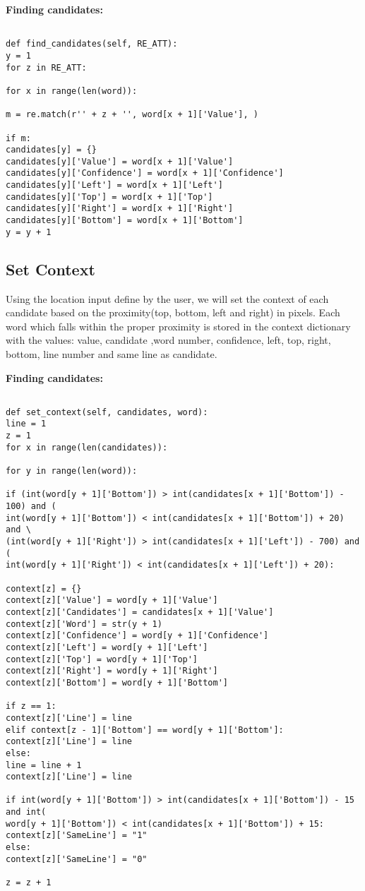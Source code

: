 \bigskip
\noindent
\textbf{Finding candidates:}
\begin{footnotesize}
\begin{verbatim}

def find_candidates(self, RE_ATT):
y = 1
for z in RE_ATT:

for x in range(len(word)):

m = re.match(r'' + z + '', word[x + 1]['Value'], )

if m:
candidates[y] = {}
candidates[y]['Value'] = word[x + 1]['Value']
candidates[y]['Confidence'] = word[x + 1]['Confidence']
candidates[y]['Left'] = word[x + 1]['Left']
candidates[y]['Top'] = word[x + 1]['Top']
candidates[y]['Right'] = word[x + 1]['Right']
candidates[y]['Bottom'] = word[x + 1]['Bottom']
y = y + 1
\end{verbatim}
\end{footnotesize}

\subsection{Set Context}

Using the location input define by the user, we will set the context of each
candidate based on the proximity(top, bottom, left and right) in pixels.
Each word which falls within the proper proximity is stored in the context
dictionary with the values: value, candidate ,word number, confidence,
left, top, right, bottom, line number and same line as candidate.

\bigskip
\noindent
\textbf{Finding candidates:}
\begin{footnotesize}
\begin{verbatim}

def set_context(self, candidates, word):
line = 1
z = 1
for x in range(len(candidates)):

for y in range(len(word)):

if (int(word[y + 1]['Bottom']) > int(candidates[x + 1]['Bottom']) - 100) and (
int(word[y + 1]['Bottom']) < int(candidates[x + 1]['Bottom']) + 20) and \
(int(word[y + 1]['Right']) > int(candidates[x + 1]['Left']) - 700) and (
int(word[y + 1]['Right']) < int(candidates[x + 1]['Left']) + 20):

context[z] = {}
context[z]['Value'] = word[y + 1]['Value']
context[z]['Candidates'] = candidates[x + 1]['Value']
context[z]['Word'] = str(y + 1)
context[z]['Confidence'] = word[y + 1]['Confidence']
context[z]['Left'] = word[y + 1]['Left']
context[z]['Top'] = word[y + 1]['Top']
context[z]['Right'] = word[y + 1]['Right']
context[z]['Bottom'] = word[y + 1]['Bottom']

if z == 1:
context[z]['Line'] = line
elif context[z - 1]['Bottom'] == word[y + 1]['Bottom']:
context[z]['Line'] = line
else:
line = line + 1
context[z]['Line'] = line

if int(word[y + 1]['Bottom']) > int(candidates[x + 1]['Bottom']) - 15 and int(
word[y + 1]['Bottom']) < int(candidates[x + 1]['Bottom']) + 15:
context[z]['SameLine'] = "1"
else:
context[z]['SameLine'] = "0"

z = z + 1

\end{verbatim}
\end{footnotesize}

